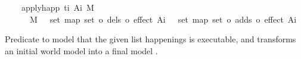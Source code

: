 \begin{isabellebody}
\ \ \ \ {\isachardoublequoteopen}apply{\isacharunderscore}{\kern0pt}happ\ {\isacharparenleft}{\kern0pt}t\isactrlsub i{\isacharcomma}{\kern0pt}\ A\isactrlsub i{\isacharparenright}{\kern0pt}\ M\ {\isacharequal}{\kern0pt}\ \isanewline
\ \ \ \ \ \ {\isacharparenleft}{\kern0pt}M\ {\isacharminus}{\kern0pt}\ {\isasymUnion}\ {\isacharparenleft}{\kern0pt}set\ {\isacharparenleft}{\kern0pt}map\ {\isacharparenleft}{\kern0pt}set\ o\ dels\ o\ effect{\isacharparenright}{\kern0pt}\ A\isactrlsub i{\isacharparenright}{\kern0pt}{\isacharparenright}{\kern0pt}{\isacharparenright}{\kern0pt}\ {\isasymunion}\ {\isasymUnion}\ {\isacharparenleft}{\kern0pt}set\ {\isacharparenleft}{\kern0pt}map\ {\isacharparenleft}{\kern0pt}set\ o\ adds\ o\ effect{\isacharparenright}{\kern0pt}\ A\isactrlsub i{\isacharparenright}{\kern0pt}{\isacharparenright}{\kern0pt}{\isachardoublequoteclose}%
\begin{isamarkuptext}%
Predicate to model that the given list happenings is
    executable, and transforms an initial world model  into a final
    model .


\end{isamarkuptext}
\end{isabellebody}
